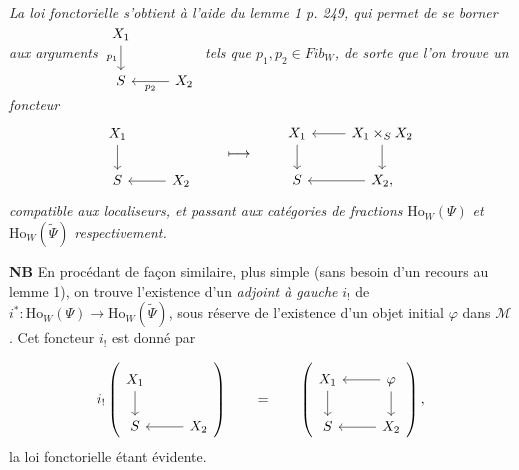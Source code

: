 \documentclass[11pt]{article}
\newcommand{\printedpage}[1]{\marginpar{\footnotesize p.~#1}}
\newcommand{\msp}[1]{\marginpar{\footnotesize [#1]}}
\newcommand{\Ho}{\mathrm{Ho}}
\begin{document}
\printedpage{165}

\textit{La loi fonctorielle s'obtient à l'aide du lemme 1 p. 249, qui permet de se borner aux arguments $\begin{tikzcd}[ampersand replacement=\&] X_1 \arrow[d, "p_1"'] \& \\ S \& X_2 \arrow[l, "p_2"] \end{tikzcd}$ tels que $p_1,p_2\in \mathit{Fib}_W$, de sorte que l'on trouve un foncteur}
\[
\begin{tikzcd}[ampersand replacement=\&]
X_1 \arrow[d] \& \\
S \& X_2 \arrow[l]
\end{tikzcd}
\qquad\longmapsto\qquad
\begin{tikzcd}[ampersand replacement=\&]
X_1 \arrow[d] \& X_1\times_S X_2 \arrow[l] \arrow[d] \\
S \& X_2, \arrow[l]
\end{tikzcd}
\]
\textit{compatible aux localiseurs, et passant aux catégories de fractions} $\Ho_W(\Psi)$ \textit{et} $\Ho_W(\tilde{\Psi})$ \textit{respectivement.}

\textbf{NB} En procédant de façon similaire, plus simple (sans besoin d'un recours au lemme 1), on trouve l'existence d'un \textit{adjoint à gauche} $i_!$ de $i^* : \Ho_W(\Psi)\longrightarrow \Ho_W(\tilde{\Psi})$, sous réserve de l'existence d'un objet initial $\varphi$ dans $\mathcal{M}$. Cet foncteur $i_!$ est donné par %

\msp{page 255}
\[
i_!\left(
\begin{tikzcd}[ampersand replacement=\&]
X_1 \arrow[d] \& \\
S \& X_2 \arrow[l]
\end{tikzcd}
\right)
\qquad = \qquad
\left(
\begin{tikzcd}[ampersand replacement=\&]
X_1 \arrow[d] \& \varphi \arrow[l] \arrow[d] \\
S \& X_2 \arrow[l]
\end{tikzcd}
\right),
\]
la loi fonctorielle étant évidente.
\end{document}

